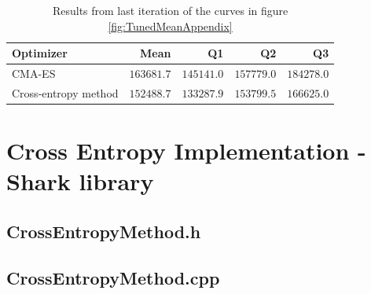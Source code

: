 \begin{table}[H]
\centering
\small
\begin{tabular}{l r r r r}
Optimizer & Mean & Q1 & Q2 & Q3\\
\hline
CMA-ES  & $163681.7$ & $145141.0$ & $157779.0$ & $184278.0$\\
Cross-entropy method & $152488.7$ & $133287.9$ & $153799.5$ & $166625.0$\\
\end{tabular}
\caption{Results from last iteration of the curves in figure \ref{fig:TunedMeanAppendix}}
\end{table}


\clearpage

%

%



\section{Cross Entropy Implementation - Shark library \label{app:crossEntropyCode}}

\subsection{CrossEntropyMethod.h}



\clearpage

\subsection{CrossEntropyMethod.cpp}


